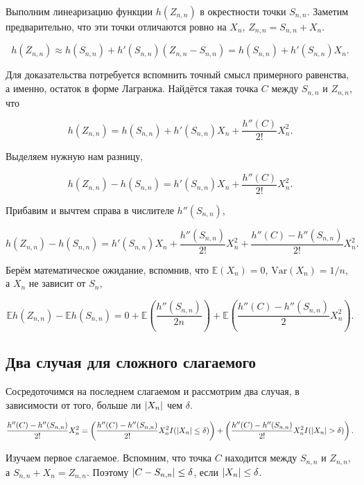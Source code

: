 \documentclass[
  letterpaper,
  DIV=11,
  numbers=noendperiod]{scrartcl}
\newcommand\E{{\mathbb{E}}}
\newcommand\Var{{\mathrm{Var}}}
\begin{document}
Выполним линеаризацию функции \(h(Z_{n,n})\) в окрестности точки
\(S_{n,n}\). Заметим предварительно, что эти точки отличаются ровно на
\(X_n\), \(Z_{n,n} = S_{n,n} + X_n\).

\[
h(Z_{n,n}) \approx h(S_{n,n}) + h'(S_{n,n})(Z_{n,n} - S_{n,n}) = h(S_{n,n}) + h'(S_{n,n}) X_n.
\]

Для доказательства потребуется вспомнить точный смысл примерного
равенства, а именно, остаток в форме Лагранжа. Найдётся такая точка
\(C\) между \(S_{n,n}\) и \(Z_{n,n}\), что

\[
h(Z_{n,n}) = h(S_{n,n}) + h'(S_{n,n})X_n + \frac{h''(C)}{2!}X_n^2.
\]

Выделяем нужную нам разницу,

\[
h(Z_{n,n}) - h(S_{n,n}) = h'(S_{n,n})X_n + \frac{h''(C)}{2!}X_n^2.
\]

Прибавим и вычтем справа в числителе \(h''(S_{n,n})\),

\[
h(Z_{n,n}) - h(S_{n,n}) = h'(S_{n,n})X_n + \frac{h''(S_{n,n})}{2!}X_n^2 + \frac{h''(C) - h''(S_{n,n})}{2!}X_n^2.
\]

Берём математическое ожидание, вспомнив, что \(\E(X_n) =0\),
\(\Var(X_n)= 1/n\), а \(X_n\) не зависит от \(S_n\),

\[
\E h(Z_{n,n}) - \E h(S_{n,n}) = 0 + \E\left(\frac{h''(S_{n,n})}{2n}\right) + \E\left(\frac{h''(C) - h''(S_{n,n})}{2}X_n^2\right).
\]

\hypertarget{ux434ux432ux430-ux441ux43bux443ux447ux430ux44f-ux434ux43bux44f-ux441ux43bux43eux436ux43dux43eux433ux43e-ux441ux43bux430ux433ux430ux435ux43cux43eux433ux43e}{%
\subsection{Два случая для сложного
слагаемого}\label{ux434ux432ux430-ux441ux43bux443ux447ux430ux44f-ux434ux43bux44f-ux441ux43bux43eux436ux43dux43eux433ux43e-ux441ux43bux430ux433ux430ux435ux43cux43eux433ux43e}}

Сосредоточимся на последнем слагаемом и рассмотрим два случая, в
зависимости от того, больше ли \(\abs{X_n}\) чем \(\delta\).

\[
\frac{h''(C) - h''(S_{n,n})}{2!}X_n^2 = \left(\frac{h''(C) - h''(S_{n,n})}{2!}X_n^2I(\abs{X_n} \leq \delta)\right) + \left(\frac{h''(C) - h''(S_{n,n})}{2!}X_n^2I(\abs{X_n} > \delta)\right).
\]

Изучаем первое слагаемое. Вспомним, что точка \(C\) находится между
\(S_{n,n}\) и \(Z_{n,n}\), а \(S_{n,n} + X_n = Z_{n,n}\). Поэтому
\(\abs{C - S_{n,n}} \leq \delta\), если \(\abs{X_n}\leq \delta\).
\end{document}
